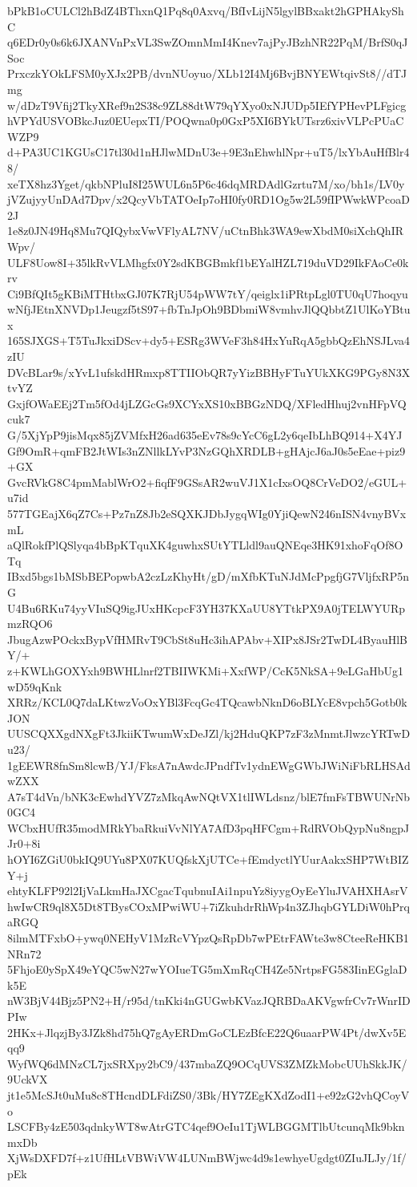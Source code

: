 bPkB1oCULCl2hBdZ4BThxnQ1Pq8q0Axvq/BfIvLijN5lgylBBxakt2hGPHAkyShC
q6EDr0y0s6k6JXANVnPxVL3SwZOmnMmI4Knev7ajPyJBzhNR22PqM/BrfS0qJSoc
PrxczkYOkLFSM0yXJx2PB/dvnNUoyuo/XLb12I4Mj6BvjBNYEWtqivSt8//dTJmg
w/dDzT9Vfij2TkyXRef9n2S38c9ZL88dtW79qYXyo0xNJUDp5IEfYPHevPLFgicg
hVPYdUSVOBkcJuz0EUepxTI/POQwna0p0GxP5XI6BYkUTsrz6xivVLPcPUaCWZP9
d+PA3UC1KGUsC17tl30d1nHJlwMDnU3e+9E3nEhwhlNpr+uT5/lxYbAuHfBlr48/
xeTX8hz3Yget/qkbNPluI8I25WUL6n5P6c46dqMRDAdlGzrtu7M/xo/bh1s/LV0y
jVZujyyUnDAd7Dpv/x2QcyVbTATOeIp7oHI0fy0RD1Og5w2L59fIPWwkWPcoaD2J
1e8z0JN49Hq8Mu7QIQybxVwVFlyAL7NV/uCtnBhk3WA9ewXbdM0siXchQhIRWpv/
ULF8Uow8I+35lkRvVLMhgfx0Y2sdKBGBmkf1bEYalHZL719duVD29IkFAoCe0krv
Ci9BfQIt5gKBiMTHtbxGJ07K7RjU54pWW7tY/qeiglx1iPRtpLgl0TU0qU7hoqyu
wNfjJEtnXNVDp1Jeugzf5tS97+fbTnJpOh9BDbmiW8vmhvJlQQbbtZ1UlKoYBtux
165SJXGS+T5TuJkxiDScv+dy5+ESRg3WVeF3h84HxYuRqA5gbbQzEhNSJLva4zIU
DVcBLar9s/xYvL1ufskdHRmxp8TTIIObQR7yYizBBHyFTuYUkXKG9PGy8N3XtvYZ
GxjfOWaEEj2Tm5fOd4jLZGcGs9XCYxXS10xBBGzNDQ/XFledHhuj2vnHFpVQcuk7
G/5XjYpP9jisMqx85jZVMfxH26ad635eEv78s9cYcC6gL2y6qeIbLhBQ914+X4YJ
Gf9OmR+qmFB2JtWIs3nZNllkLYvP3NzGQhXRDLB+gHAjcJ6aJ0s5eEae+piz9+GX
GvcRVkG8C4pmMablWrO2+fiqfF9GSsAR2wuVJ1X1cIxsOQ8CrVeDO2/eGUL+u7id
577TGEajX6qZ7Cs+Pz7nZ8Jb2eSQXKJDbJygqWIg0YjiQewN246nISN4vnyBVxmL
aQlRokfPlQSlyqa4bBpKTquXK4guwhxSUtYTLldl9auQNEqe3HK91xhoFqOf8OTq
IBxd5bgs1bMSbBEPopwbA2czLzKhyHt/gD/mXfbKTuNJdMcPpgfjG7VljfxRP5nG
U4Bu6RKu74yyVIuSQ9igJUxHKcpcF3YH37KXaUU8YTtkPX9A0jTELWYURpmzRQO6
JbugAzwPOckxBypVfHMRvT9CbSt8uHc3ihAPAbv+XIPx8JSr2TwDL4ByauHlBY/+
z+KWLhGOXYxh9BWHLlnrf2TBIIWKMi+XxfWP/CcK5NkSA+9eLGaHbUg1wD59qKnk
XRRz/KCL0Q7daLKtwzVoOxYBl3FcqGc4TQcawbNknD6oBLYcE8vpch5Gotb0kJON
UUSCQXXgdNXgFt3JkiiKTwumWxDeJZl/kj2HduQKP7zF3zMnmtJlwzcYRTwDu23/
1gEEWR8fnSm8lcwB/YJ/FksA7nAwdcJPndfTv1ydnEWgGWbJWiNiFbRLHSAdwZXX
A7sT4dVn/bNK3cEwhdYVZ7zMkqAwNQtVX1tlIWLdsnz/blE7fmFsTBWUNrNb0GC4
WCbxHUfR35modMRkYbaRkuiVvNlYA7AfD3pqHFCgm+RdRVObQypNu8ngpJJr0+8i
hOYI6ZGiU0bkIQ9UYu8PX07KUQfskXjUTCe+fEmdyctlYUurAakxSHP7WtBIZY+j
ehtyKLFP92l2IjVaLkmHaJXCgacTqubnuIAi1npuYz8iyygOyEeYluJVAHXHAsrV
hwIwCR9ql8X5Dt8TBysCOxMPwiWU+7iZkuhdrRhWp4n3ZJhqbGYLDiW0hPrqaRGQ
8ilmMTFxbO+ywq0NEHyV1MzRcVYpzQsRpDb7wPEtrFAWte3w8CteeReHKB1NRn72
5FhjoE0ySpX49eYQC5wN27wYOIueTG5mXmRqCH4Ze5NrtpsFG583IinEGglaDk5E
nW3BjV44Bjz5PN2+H/r95d/tnKki4nGUGwbKVazJQRBDaAKVgwfrCv7rWnrIDPIw
2HKx+JlqzjBy3JZk8hd75hQ7gAyERDmGoCLEzBfcE22Q6uaarPW4Pt/dwXv5Eqq9
WyfWQ6dMNzCL7jxSRXpy2bC9/437mbaZQ9OCqUVS3ZMZkMobcUUhSkkJK/9UckVX
jt1e5McSJt0uMu8c8THcndDLFdiZS0/3Bk/HY7ZEgKXdZodI1+e92zG2vhQCoyVo
LSCFBy4zE503qdnkyWT8wAtrGTC4qef9OeIu1TjWLBGGMTlbUtcunqMk9bknmxDb
XjWsDXFD7f+z1UfHLtVBWiVW4LUNmBWjwc4d9s1ewhyeUgdgt0ZIuJLJy/1f/pEk
